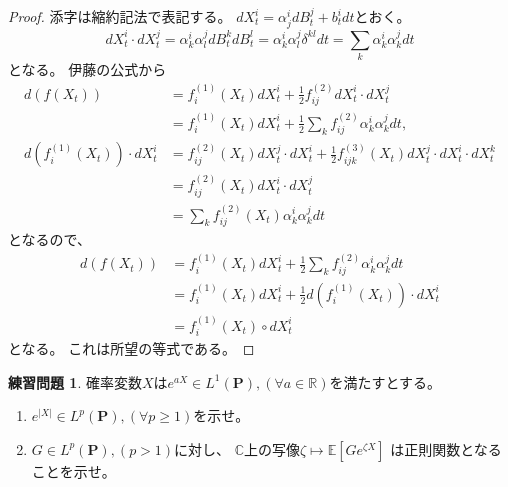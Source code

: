 \documentclass[uplatex]{jsarticle}
\theoremstyle{definition}
\newtheorem{prob}[prob]{練習問題}
\def\C{\mathbb{C}}
\def\R{\mathbb{R}}
\def\P{\mathbf{P}}
\def\E{\mathbb{E}}
\begin{document}
\begin{proof}
  添字は縮約記法で表記する。
  \(dX_t^i = \alpha^i_jdB_t^j + b_t^idt\)とおく。
  \[
  dX_t^i\cdot dX_t^j = \alpha^i_k\alpha^j_ldB_t^kdB_t^l
  = \alpha^i_k\alpha^j_l\delta^{kl}dt
  = \sum_k \alpha^i_k\alpha^j_kdt
  \]
  となる。
  伊藤の公式から
  \begin{align*}
    d(f(X_t))
    &= f_i^{(1)}(X_t)dX_t^i
    + \frac{1}{2} f_{ij}^{(2)}dX_t^i\cdot dX_t^j \\
    &= f_i^{(1)}(X_t)dX_t^i
    + \frac{1}{2} \sum_k f_{ij}^{(2)}\alpha^i_k\alpha^j_kdt , \\
    d(f_i^{(1)}(X_t))\cdot dX_t^i
    &= f_{ij}^{(2)}(X_t)dX_t^j\cdot dX_t^i
    + \frac{1}{2} f_{ijk}^{(3)}(X_t)dX_t^j\cdot dX_t^i\cdot dX_t^k \\
    &= f_{ij}^{(2)}(X_t)dX_t^i\cdot dX_t^j \\
    &= \sum_k f_{ij}^{(2)}(X_t)\alpha^i_k\alpha^j_kdt
  \end{align*}
  となるので、
  \begin{align*}
    d(f(X_t))
    &= f_i^{(1)}(X_t)dX_t^i
    + \frac{1}{2}\sum_k f_{ij}^{(2)}\alpha^i_k\alpha^j_kdt \\
    &= f_i^{(1)}(X_t)dX_t^i
    + \frac{1}{2} d(f_i^{(1)}(X_t))\cdot dX_t^i \\
    &= f_i^{(1)}(X_t)\circ dX_t^i
  \end{align*}
  となる。
  これは所望の等式である。
\end{proof}






\begin{prob}\label{prob: 4.6}
  確率変数\(X\)は\(e^{aX}\in L^1(\P) , (\forall a\in \R)\)を満たすとする。
  \begin{enumerate}
    \item \label{enumi: prob: 4.6-1}
    \(e^{|X|}\in L^p(\P) , (\forall p \geq 1)\)を示せ。
    \item \label{enumi: prob: 4.6-2}
    \(G\in L^p(\P), (p > 1)\)に対し、
    \(\C\)上の写像\(\zeta \mapsto \E\left[ Ge^{\zeta X}\right]\)
    は正則関数となることを示せ。
  \end{enumerate}
\end{prob}
\end{document}
